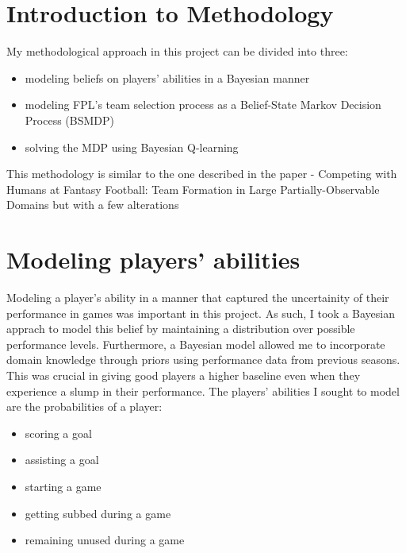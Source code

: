 \section{Introduction to Methodology}
My methodological approach in this project can be divided into three: 
\begin{itemize}
    \item modeling beliefs on players' abilities in a Bayesian manner
    \item modeling FPL's team selection process as a Belief-State Markov Decision Process (BSMDP)
    \item solving the MDP using Bayesian Q-learning
\end{itemize}
This methodology is similar to the one described in the paper - Competing with Humans at Fantasy Football: Team Formation in Large Partially-Observable Domains \cite{matthews2012} but with a few alterations

\section{Modeling players' abilities}
Modeling a player's ability in a manner that captured the uncertainity of their performance in games was important in this project. As such, I took a Bayesian apprach to model this belief by maintaining a distribution over possible performance levels. Furthermore, a Bayesian model allowed me to incorporate domain knowledge through priors using performance data from previous seasons. This was crucial in giving good players a higher baseline even when they experience a slump in their performance. The players' abilities I sought to model are the probabilities of a player: 
\begin{itemize}
    \item scoring a goal
    \item assisting a goal
    \item starting a game
    \item getting subbed during a game
    \item remaining unused during a game
\end{itemize}

